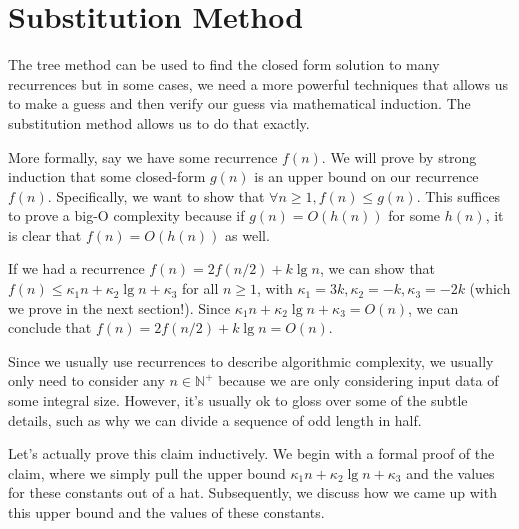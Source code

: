 \section{Substitution Method}
\label{sec:analysis::recurrences::substitution-method}

\begin{gram}
The tree method can be used to find the closed form solution to many
recurrences but in some cases, we need a more powerful techniques that
allows us to make a guess and then verify our guess via mathematical induction.
%
The substitution method allows us to do that exactly.
%
\end{gram}

\begin{gram}
More formally, say we have some recurrence $f(n)$. We will prove by strong induction
that some closed-form $g(n)$ is an upper bound on our recurrence $f(n)$.
Specifically, we want to show that $\forall n \geq 1, f(n) \leq g(n)$.
This suffices to prove a big-O complexity because if $g(n) = O(h(n))$ for some
$h(n)$, it is clear that $f(n) = O(h(n))$ as well.
\end{gram}

\begin{example}
If we had a recurrence $f(n) = 2 f(n/2) + k \lg n$, we can show that
$f(n) \leq \kappa_1 n + \kappa_2 \lg n + \kappa_3$ for all $n \geq 1$, with
$\kappa_1 = 3k, \kappa_2 = -k, \kappa_3 = -2k$ (which we prove in the next
section!). Since $\kappa_1 n + \kappa_2 \lg n + \kappa_3 = O(n)$, we can
conclude that $f(n) = 2 f(n/2) + k \lg n = O(n)$.
\end{example}

\begin{note}
Since we usually use recurrences to describe algorithmic complexity,
we usually only need to consider any $n \in \mathbb{N}^+$ because we are only
considering input data of some integral size. However, it's usually ok
to gloss over some of the subtle details, such as why we can divide a sequence
of odd length in half.
\end{note}

\begin{gram}
Let's actually prove this claim inductively.
We begin with a formal proof of the claim, where we simply
pull the upper bound $\kappa_1 n + \kappa_2 \lg n + \kappa_3$ and the values
for these constants out of a hat. Subsequently, we discuss how we came up with
this upper bound and the values of these constants.
\end{gram}

